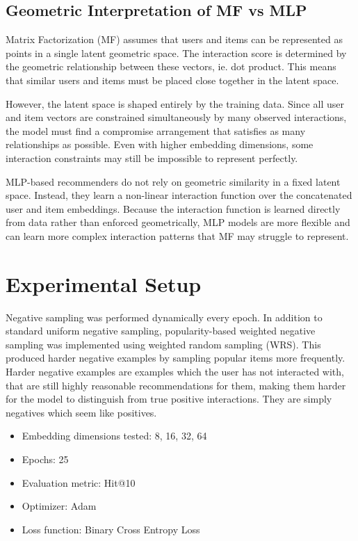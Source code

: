 \documentclass{article}
\begin{document}
\subsection{Geometric Interpretation of MF vs MLP}

Matrix Factorization (MF) assumes that users and items can be represented as points in a single latent geometric space. The interaction score is determined by the geometric relationship between these vectors, ie. dot product. This means that similar users and items must be placed close together in the latent space.

However, the latent space is shaped entirely by the training data. Since all user and item vectors are constrained simultaneously by many observed interactions, the model must find a compromise arrangement that satisfies as many relationships as possible. Even with higher embedding dimensions, some interaction constraints may still be impossible to represent perfectly.

MLP-based recommenders do not rely on geometric similarity in a fixed latent space. Instead, they learn a non-linear interaction function over the concatenated user and item embeddings. Because the interaction function is learned directly from data rather than enforced geometrically, MLP models are more flexible and can learn more complex interaction patterns that MF may struggle to represent.

\section{Experimental Setup}

Negative sampling was performed dynamically every epoch. In addition to standard uniform negative sampling, popularity-based weighted negative sampling was implemented using weighted random sampling (WRS). This produced harder negative examples by sampling popular items more frequently. Harder negative examples are examples which the user has not interacted with, that are still highly reasonable recommendations for them, making them harder for the model to distinguish from true positive interactions. They are simply negatives which seem like positives.


\begin{itemize}
    \item Embedding dimensions tested: 8, 16, 32, 64
    \item Epochs: 25
    \item Evaluation metric: Hit@10
    \item Optimizer: Adam
    \item Loss function: Binary Cross Entropy Loss
\end{itemize}
\end{document}

